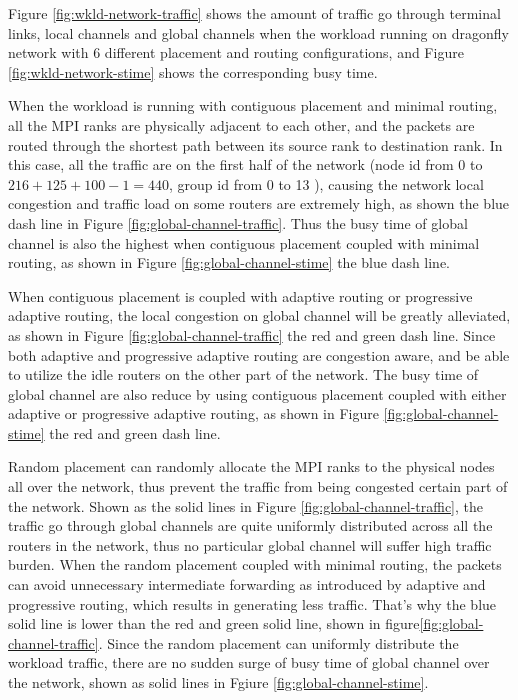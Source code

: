 \documentclass[conference,compsoc]{IEEEtran}
\begin{document}
Figure \ref{fig:wkld-network-traffic} shows the amount of traffic go through terminal links, local channels and global channels when the workload running on dragonfly network with 6 different placement and routing configurations, and Figure \ref{fig:wkld-network-stime} shows the corresponding busy time. 

When the workload is running with contiguous placement and minimal routing, all the MPI ranks are physically adjacent to each other, and the packets are routed through the shortest path between its source rank to destination rank. In this case, all the traffic are on the first half of the network (node id from 0 to $216+125+100-1=440$, group id from 0 to 13 ), causing the network local congestion and traffic load on some routers are extremely high, as shown the blue dash line in Figure \ref{fig:global-channel-traffic}. Thus the busy time of global channel is also the highest when contiguous placement coupled with minimal routing, as shown in Figure \ref{fig:global-channel-stime} the blue dash line. 

When contiguous placement is coupled with adaptive routing or progressive adaptive routing, the local congestion on global channel will be greatly alleviated, as shown in Figure \ref{fig:global-channel-traffic} the red and green dash line. Since both adaptive and progressive adaptive routing are congestion aware, and be able to utilize the idle routers on the other part of the network. The busy time of global channel are also reduce by using contiguous placement coupled with either adaptive or progressive adaptive routing, as shown in Figure \ref{fig:global-channel-stime} the red and green dash line. 

Random placement can randomly allocate the MPI ranks to the physical nodes all over the network, thus prevent the traffic from being congested certain part of the network. Shown as the solid lines in Figure \ref{fig:global-channel-traffic}, the traffic go through global channels are quite uniformly distributed across all the routers in the network, thus no particular global channel will suffer high traffic burden. When the random placement coupled with minimal routing, the packets can avoid unnecessary intermediate forwarding as introduced by adaptive and progressive routing, which results in generating less traffic. That's why the blue solid line is lower than the red and green solid line, shown in figure\ref{fig:global-channel-traffic}. Since the random placement can uniformly distribute the workload traffic, there are no sudden surge of busy time of global channel over the network, shown as solid lines in Fgiure \ref{fig:global-channel-stime}.
\end{document}
